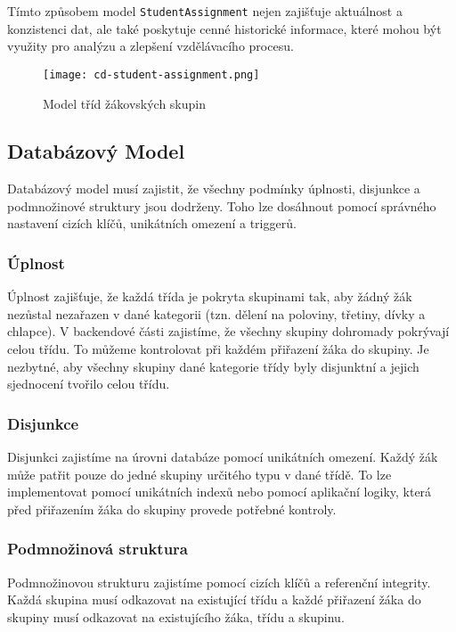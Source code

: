 Tímto způsobem model \texttt{StudentAssignment} nejen zajišťuje aktuálnost a konzistenci dat, ale také poskytuje cenné historické informace, které mohou být využity pro analýzu a zlepšení vzdělávacího procesu.

\begin{figure}[H]
    \centering
    \texttt{[image: cd-student-assignment.png]}
    \caption{Model tříd žákovských skupin}
    \label{fig:cd-student-assignment}
 \end{figure}

\subsection{Databázový Model}

Databázový model musí zajistit, že všechny podmínky úplnosti, disjunkce a podmnožinové struktury jsou dodrženy. Toho lze dosáhnout pomocí správného nastavení cizích klíčů, unikátních omezení a triggerů.

\subsubsection*{Úplnost}

Úplnost zajišťuje, že každá třída je pokryta skupinami tak, aby žádný žák nezůstal nezařazen v dané kategorii (tzn. dělení na poloviny, třetiny, dívky a chlapce). V backendové části zajistíme, že všechny skupiny dohromady pokrývají celou třídu. To můžeme kontrolovat při každém přiřazení žáka do skupiny. Je nezbytné, aby všechny skupiny dané kategorie třídy byly disjunktní a jejich sjednocení tvořilo celou třídu.

\subsubsection*{Disjunkce}

Disjunkci zajistíme na úrovni databáze pomocí unikátních omezení. Každý žák může patřit pouze do jedné skupiny určitého typu v dané třídě. To lze implementovat pomocí unikátních indexů nebo pomocí aplikační logiky, která před přiřazením žáka do skupiny provede potřebné kontroly.

\subsubsection*{Podmnožinová struktura}

Podmnožinovou strukturu zajistíme pomocí cizích klíčů a referenční integrity. Každá skupina musí odkazovat na existující třídu a každé přiřazení žáka do skupiny musí odkazovat na existujícího žáka, třídu a skupinu.

